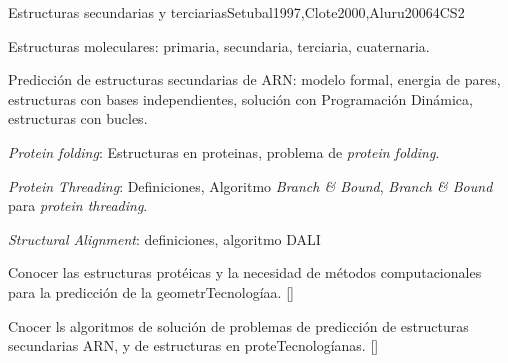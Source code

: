 \begin{syllabus}
\begin{unit}{Estructuras secundarias y terciarias}{}{Setubal1997,Clote2000,Aluru2006}{4}{CS2}
   \begin{topics}
    \item Estructuras moleculares: primaria, secundaria, terciaria, cuaternaria.
    \item Predicción de estructuras secundarias de ARN: modelo formal, energia de pares, estructuras con bases independientes, solución con Programación Dinámica, estructuras con bucles.
    \item {\it Protein folding}: Estructuras en proteinas, problema de \textit{protein folding}.
    \item {\it Protein Threading}: Definiciones, Algoritmo \textit{Branch \& Bound}, \textit{Branch \& Bound} para \textit{protein threading}.
    \item {\it Structural Alignment}: definiciones, algoritmo DALI
   \end{topics}
   \begin{learningoutcomes}
     \item Conocer las estructuras protéicas y la necesidad de métodos computacionales para la predicción de la geometrTecnologíaa. [\Familiarity]
	   \item Cnocer ls algoritmos de solución de problemas de predicción de estructuras secundarias ARN, y de estructuras en proteTecnologíanas. [\Assessment]
   \end{learningoutcomes}
\end{unit}


\end{syllabus}
